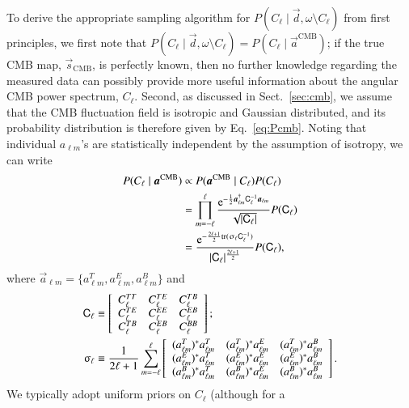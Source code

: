 \documentclass[onecolumn]{aa}
\renewcommand{\d}[0]{\vec{d}}
\newcommand{\s}[0]{\vec{s}}
\renewcommand{\a}[0]{\vec{a}}
\renewcommand{\C}[0]{\tens{C}}
\newcommand{\e}{\mathrm e}
\begin{document}
To derive the appropriate sampling algorithm for ${P(C_{\ell}\mid \d,
  \omega\setminus C_{\ell})}$ from first principles, we first note
that $P(C_{\ell}\mid \d, \omega\setminus C_{\ell}) = P(C_{\ell}\mid
\a^{\mathrm{CMB}})$; if the true CMB map, $\s_{\mathrm{CMB}}$, is
perfectly known, then no further knowledge regarding the measured data
can possibly provide more useful information about the angular CMB power
spectrum, $C_{\ell}$. Second, as discussed in
Sect.~\ref{sec:cmb}, we assume that the CMB fluctuation field is
isotropic and Gaussian distributed, and its probability distribution
is therefore given by Eq.~\eqref{eq:Pcmb}. Noting that individual
$a_{\ell m}$'s are statistically independent by the assumption of
isotropy, we can write \citep{wandelt2004}
\begin{align}
  P(C_{\ell}\mid \a^{\mathrm{CMB}}) &\propto
  P(\a^{\mathrm{CMB}}\mid C_{\ell})P(C_{\ell}) \\
  &= \prod_{m=-{\ell}}^{\ell} \frac{\e^{-\frac{1}{2}\a_{\ell
        m}^{\dagger} \C_{\ell}^{-1} \a_{\ell m}}}{\sqrt{|\C_{\ell}|}}
  P(\C_{\ell})\\
  &=
  \frac{\e^{-\frac{2\ell+1}{2}\mathrm{tr}(\upsigma_{\ell}\C_{\ell}^{-1})}}{|\C_{\ell}|^{\frac{2\ell+1}{2}}}
  P(\C_{\ell}),
  \label{eq:invwishart}
\end{align}
where $\a_{\ell m} = \{a_{\ell m}^{T}, a_{\ell m}^{E}, a_{\ell
  m}^{B}\}$ and
\begin{align}
  \C_{\ell}
&\equiv
  \left[
    \begin{array}{ccc}
      C_{\ell}^{TT} & C_{\ell}^{TE} & C_{\ell}^{TB} \\
      C_{\ell}^{TE} & C_{\ell}^{EE} & C_{\ell}^{EB} \\
      C_{\ell}^{TB} & C_{\ell}^{EB} & C_{\ell}^{BB} 
    \end{array}
    \right];\\
  \upsigma_{\ell}
&\equiv \frac{1}{2\ell+1}\sum_{m=-\ell}^{\ell}
  \left[
    \begin{array}{ccc}
      (a^T_{\ell m})^* a^T_{\ell m} & (a^T_{\ell m})^* a^E_{\ell m} &
      (a^T_{\ell m})^* a^B_{\ell m} \\
      (a^E_{\ell m})^* a^T_{\ell m} & (a^E_{\ell m})^* a^E_{\ell m} &
      (a^E_{\ell m})^* a^B_{\ell m} \\
      (a^B_{\ell m})^* a^T_{\ell m} & (a^B_{\ell m})^* a^E_{\ell m} &
      (a^B_{\ell m})^* a^B_{\ell m}
    \end{array}
    \right].
\end{align}
We typically adopt uniform priors on $C_{\ell}$ (although for a
\end{document}
